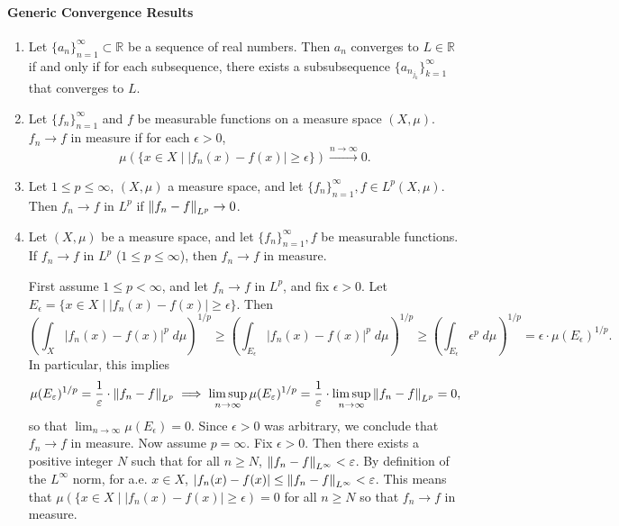 \documentclass{article}
\begin{document}
\paragraph{Generic Convergence Results}
\begin{enumerate}[resume=real_analysis]
	\item Let $\{a_{n}\}_{n = 1}^{\infty} \subset \mathbb{R}$ be a sequence of real numbers. Then $a_{n}$ converges to $L \in \mathbb{R}$ if and only if for each subsequence, there exists a subsubsequence $\{a_{n_{j_{k}}}\}_{k = 1}^{\infty}$ that converges to $L$. 
	\item Let $\{f_{n}\}_{n = 1}^{\infty}$ and $f$ be measurable functions on a measure space $(X, \mu)$. $f_{n} \to f$ in measure if for each $\epsilon > 0$, 
	\begin{equation*}
		\mu(\{x \in X \mid |f_{n}(x) - f(x)| \geq \epsilon\}) \xrightarrow{n \to \infty} 0. 
	\end{equation*}
	\item Let $1 \leq p \leq \infty$, $(X, \mu)$ a measure space, and let $\{f_{n}\}_{n = 1}^{\infty}, f \in L^{p}(X,\mu)$. Then $f_{n} \to f$ in $L^{p}$ if $\left\Vert f_{n} - f \right\Vert_{L^{p}} \to 0$. 
	\item Let $(X, \mu)$ be a measure space, and let $\{f_{n}\}_{n = 1}^{\infty}, f$ be measurable functions. If $f_{n} \to f$ in $L^{p}$ ($1 \leq p \leq \infty$), then $f_{n} \to f$ in measure. \newline 
	\begin{solutions}
		First assume $1 \leq p < \infty$, and let $f_{n} \to f$ in $L^{p}$, and fix $\epsilon > 0$. Let $E_{\epsilon} = \{x \in X\mid |f_{n}(x) - f(x)|\geq \epsilon\}$. Then 
		\begin{equation*}
			\left(\int_{X}|f_{n}(x) - f(x)|^{p}\;d\mu\right)^{1/p} \geq \left(\int_{E_{\epsilon}}|f_{n}(x) - f(x)|^{p}\;d\mu\right)^{1/p} \geq \left(\int_{E_{\epsilon}}\epsilon^{p}\;d\mu\right)^{1/p} = \epsilon \cdot \mu(E_{\epsilon})^{1/p}. 
		\end{equation*}
		In particular, this implies 
		\begin{equation*}
			\mu(E_{\varepsilon})^{1/p} = \frac{1}{\varepsilon} \cdot\left\Vert f_{n} - f \right\Vert_{L^{p}} \implies \limsup_{n \to \infty}\mu(E_{\varepsilon})^{1/p} = \frac{1}{\varepsilon} \cdot \limsup_{n \to \infty}\left\Vert f_{n} - f \right\Vert_{L^{p}} = 0, 
		\end{equation*}
		so that $\lim_{n \to \infty}\mu(E_{\epsilon}) = 0$. Since $\epsilon > 0$ was arbitrary, we conclude that $f_{n} \to f$ in measure. Now assume $p = \infty$. Fix $\epsilon > 0$. Then there exists a positive integer $N$ such that for all $n \geq N$, $\left\Vert f_{n} - f \right\Vert_{L^{\infty}} < \varepsilon$. By definition of the $L^{\infty}$ norm, for a.e. $x \in X$, $|f_{n}(x) - f(x)| \leq \left\Vert f_{n} - f \right\Vert_{L^{\infty}} < \varepsilon$. This means that $\mu(\{x \in X\mid |f_{n}(x) -f (x)| \geq \epsilon) = 0$ for all $n \geq N$ so that $f_{n} \to f$ in measure. 

\end{solutions}
\end{enumerate}
\end{document}
